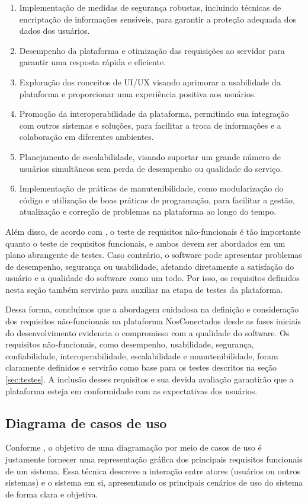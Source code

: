 \documentclass[tcc,capa]{texufpel}
\begin{document}
\begin{enumerate}
\item Implementação de medidas de segurança robustas, incluindo técnicas de encriptação de informações sensíveis, para garantir a proteção adequada dos dados dos usuários.
\item Desempenho da plataforma e otimização das requisições ao servidor para garantir uma resposta rápida e eficiente.
\item Exploração dos conceitos de UI/UX visando aprimorar a usabilidade da plataforma e proporcionar uma experiência positiva aos usuários.
\item Promoção da interoperabilidade da plataforma, permitindo sua integração com outros sistemas e soluções, para facilitar a troca de informações e a colaboração em diferentes ambientes.
\item Planejamento de escalabilidade, visando suportar um grande número de usuários simultâneos sem perda de desempenho ou qualidade do serviço.
\item Implementação de práticas de manutenibilidade, como modularização do código e utilização de boas práticas de programação, para facilitar a gestão, atualização e correção de problemas na plataforma ao longo do tempo.
\end{enumerate}

 Além disso, de acordo com \citet{PRESSMAN:2016}, o teste de requisitos não-funcionais é tão importante quanto o teste de requisitos funcionais, e ambos devem ser abordados em um plano abrangente de testes. Caso contrário, o software pode apresentar problemas de desempenho, segurança ou usabilidade, afetando diretamente a satisfação do usuário e a qualidade do software como um todo. Por isso, os requisitos definidos nesta seção também servirão para auxiliar na etapa de testes da plataforma.

Dessa forma, concluímos que a abordagem cuidadosa na definição e consideração dos requisitos não-funcionais na plataforma NosConectados desde as fases iniciais do desenvolvimento evidencia o compromisso com a qualidade do software. Os requisitos não-funcionais, como desempenho, usabilidade, segurança, confiabilidade, interoperabilidade, escalabilidade e manutenibilidade, foram claramente definidos e servirão como base para os testes descritos na seção \ref{sec:testes}. A inclusão desses requisitos e sua devida avaliação garantirão que a plataforma esteja em conformidade com as expectativas dos usuários.
\subsection{Diagrama de casos de uso}
Conforme \citet{BOOCH:2007}, o objetivo de uma diagramação por meio de casos de uso é justamente fornecer uma representação gráfica dos principais requisitos funcionais de um sistema. Essa técnica descreve a interação entre atores (usuários ou outros sistemas) e o sistema em si, apresentando os principais cenários de uso do sistema de forma clara e objetiva.
\end{document}
